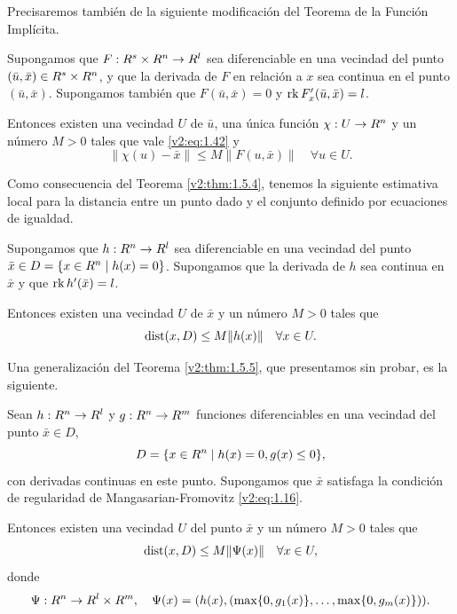 Precisaremos también de la siguiente modificación del Teorema de la Función Implícita.

\begin{theorem}\label{v2:thm:1.5.4}
    Supongamos que $F : R^s \times R^n \to R^l$ sea diferenciable en una vecindad del punto $(\bar{u}, \bar{x}) \in R^s \times R^n$, y que la derivada de $F$ en relación a $x$ sea continua en el punto $(\bar{u}, \bar{x})$. Supongamos también que $F(\bar{u}, \bar{x}) = 0$ y $\operatorname{rk} F'_x(\bar{u}, \bar{x}) = l$.
    
    Entonces existen una vecindad $U$ de $\bar{u}$, una única función $\chi : U \to R^n$ y un número $M > 0$ tales que vale \eqref{v2:eq:1.42} y
    \begin{equation}
        \|\chi(u) - \bar{x}\| \le M \|F(u, \bar{x})\| \quad \forall u \in U.
        \label{v2:eq:1.43}
    \end{equation}
\end{theorem}

Como consecuencia del Teorema \ref{v2:thm:1.5.4}, tenemos la siguiente estimativa local para la distancia entre un punto dado y el conjunto definido por ecuaciones de igualdad.

\begin{theorem}\label{v2:thm:1.5.5}
    Supongamos que $h : R^n \to R^l$ sea diferenciable en una vecindad del punto $\bar{x} \in D = \{x \in R^n \mid h(x) = 0\}$. Supongamos que la derivada de $h$ sea continua en $\bar{x}$ y que $\operatorname{rk} h'(\bar{x}) = l$.
    
    Entonces existen una vecindad $U$ de $\bar{x}$ y un número $M > 0$ tales que
    \begin{equation}
        \operatorname{dist}(x, D) \le M \|h(x)\| \quad \forall x \in U.
        \label{v2:eq:1.44}
    \end{equation}
\end{theorem}

Una generalización del Teorema \ref{v2:thm:1.5.5}, que presentamos sin probar, es la siguiente.

\begin{theorem}\label{v2:thm:1.5.6}
    Sean $h : R^n \to R^l$ y $g : R^n \to R^m$ funciones diferenciables en una vecindad del punto $\bar{x} \in D$,
    \[
        D = \{x \in R^n \mid h(x) = 0, g(x) \le 0\},
    \]
    con derivadas continuas en este punto. Supongamos que $\bar{x}$ satisfaga la condición de regularidad de Mangasarian-Fromovitz \eqref{v2:eq:1.16}.
    
    Entonces existen una vecindad $U$ del punto $\bar{x}$ y un número $M > 0$ tales que
    \begin{equation}
        \operatorname{dist}(x, D) \le M \|\Psi(x)\| \quad \forall x \in U,
        \label{v2:eq:1.45}
    \end{equation}
    donde
    \[
        \Psi : R^n \to R^l \times R^m, \quad \Psi(x) = (h(x), (\max\{0, g_1(x)\}, \dots, \max\{0, g_m(x)\})).
    \]
\end{theorem}